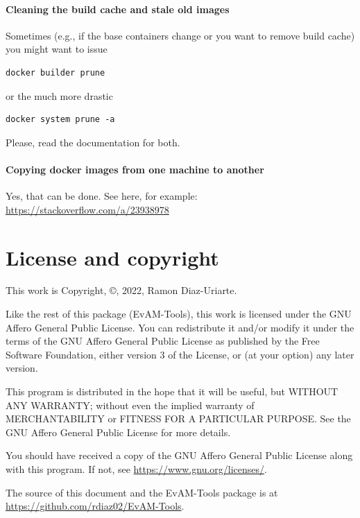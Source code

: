 \documentclass[a4paper,11pt]{article}
\begin{document}
\paragraph{Cleaning the build cache and stale old images}
Sometimes (e.g., if the base containers change or you want to remove build cache) you might want to issue

\begin{verbatim}
docker builder prune
\end{verbatim}

or the much more drastic

\begin{verbatim}
docker system prune -a

\end{verbatim}
Please, read the documentation for both.


\paragraph{Copying docker images from one machine to another}
Yes, that can be done. See here, for example: \url{https://stackoverflow.com/a/23938978}


\section{License and copyright}
This work is Copyright, \copyright, 2022, Ramon Diaz-Uriarte.

Like the rest of this package (EvAM-Tools), this work is licensed under the GNU Affero General Public License. You can redistribute it and/or modify it under the terms of the GNU Affero General Public License as published by the Free Software Foundation, either version 3 of the License, or (at your option) any later version.

This program is distributed in the hope that it will be useful, but WITHOUT ANY WARRANTY; without even the implied warranty of MERCHANTABILITY or FITNESS FOR A PARTICULAR PURPOSE. See the GNU Affero General Public License for more details.

You should have received a copy of the GNU Affero General Public License along with this program. If not, see \url{https://www.gnu.org/licenses/}. 

The source of this document and the EvAM-Tools package is at \url{https://github.com/rdiaz02/EvAM-Tools}.



\end{document}
